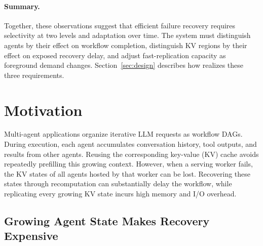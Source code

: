 \paragraph{Summary.}
Together, these observations suggest that efficient failure recovery requires selectivity at two levels and adaptation over time. The system must distinguish agents by their effect on workflow completion, distinguish KV regions by their effect on exposed recovery delay, and adjust fast-replication capacity as foreground demand changes.
Section~\ref{sec:design} describes how \system realizes these three requirements.


\iffalse
\section{Motivation} \label{sec:motivation} 

Multi-agent applications organize iterative LLM requests as workflow DAGs. During execution, each agent accumulates conversation history, tool outputs, and results from other agents. Reusing the corresponding key-value (KV) cache avoids repeatedly prefilling this growing context. However, when a serving worker fails, the KV states of all agents hosted by that worker can be lost. Recovering these states through recomputation can substantially delay the workflow, while replicating every growing KV state incurs high memory and I/O overhead. 





\subsection{Growing Agent State Makes Recovery Expensive} \label{sec:motivation:growth} 



